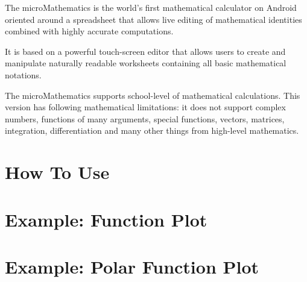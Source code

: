 \documentclass[DIV=calc, paper=a4, fontsize=11pt, twocolumn]{scrartcl}
\begin{document}
\maketitle
\thispagestyle{fancy} %

\begin{bf}
The microMathematics is the world's first mathematical
calculator on Android oriented around a spreadsheet that allows live editing of
mathematical identities combined with highly accurate computations.

It is based on a powerful touch-screen editor that allows users to create and
manipulate naturally readable worksheets containing all basic mathematical
notations.

The microMathematics supports school-level of mathematical calculations. This
version has following mathematical limitations: it does not support complex
numbers, functions of many arguments, special functions, vectors, matrices,
integration, differentiation and many other things from high-level mathematics.
\end{bf}

\section{How To Use}


\section{Example: Function Plot}


\section{Example: Polar Function Plot}

\end{document}
